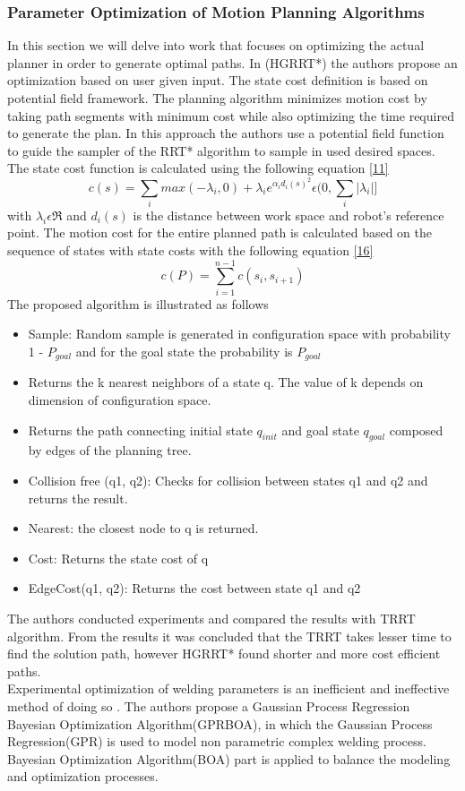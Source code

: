 \subsubsection{Parameter Optimization of Motion Planning Algorithms}
In this section we will delve into work that focuses on optimizing the actual planner in order to generate optimal paths. In \cite{11}(HGRRT*) the authors propose an optimization based on user given input. The state cost definition is based on potential field framework. The planning algorithm minimizes motion cost by taking path segments with minimum cost while also optimizing the time required to generate the plan. In this approach the authors use a potential field function to guide the sampler of the RRT* algorithm to sample in used desired spaces. The state cost function is calculated using the following equation \eqref{11}
\begin{equation}
\label{16}
c(s) = \sum_{i} max(-\lambda_{i},0 ) + \lambda_{i}e^{\alpha_{i}d_{i}(s)^2} \epsilon (0,\sum_{i}|\lambda_{i}|]
\end{equation}
with $\lambda_{i} \epsilon \Re$ and $d_{i}(s)$ is the distance between work space and robot's reference point. The motion cost for the entire planned path is calculated based on the sequence of states with state costs with the following equation \eqref{16}
\begin{equation}
\label{17}
c(P) = \sum_{i=1}^{n-1}c(s_{i},s_{i+1})
\end{equation}
The proposed algorithm is illustrated as follows
\begin{itemize}
\item Sample: Random sample is generated in configuration space with probability 1 - $P_{goal}$ and for the goal state the probability is $P_{goal}$
\item Returns the k nearest neighbors of a state q. The value of k depends on dimension of configuration space.
\item Returns the path connecting initial state $q_{init}$ and goal state $q_{goal}$ composed by edges of the planning tree.
\item Collision free (q1, q2): Checks for collision between states q1 and q2 and returns the result.
\item Nearest: the closest node to q is returned. 
\item Cost: Returns the state cost of q
\item EdgeCost(q1, q2): Returns the cost between state q1 and q2
\end{itemize}
The authors conducted experiments and compared the results with TRRT algorithm. From the results it was concluded that the TRRT takes lesser time to find the solution path, however HGRRT* found shorter and more cost efficient paths. \\
Experimental optimization of welding parameters is an inefficient and ineffective method of doing so \cite{16}. The authors propose a Gaussian Process Regression Bayesian Optimization Algorithm(GPRBOA), in which the Gaussian Process Regression(GPR) is used to model non parametric complex welding process. Bayesian Optimization Algorithm(BOA) part is applied to balance the modeling and optimization processes.
\newpage
